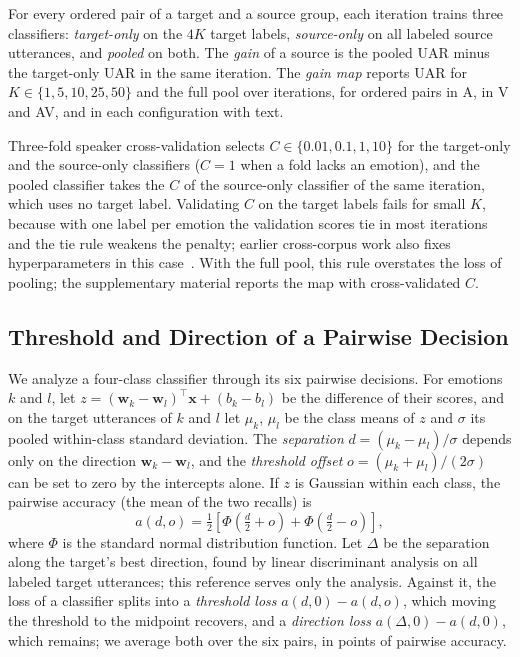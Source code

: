 For every ordered pair of a target and a source group, each iteration trains three classifiers: \emph{target-only} on the $4K$ target labels, \emph{source-only} on all labeled source utterances, and \emph{pooled} on both.
The \emph{gain} of a source is the pooled UAR minus the target-only UAR in the same iteration.
The \emph{gain map} reports UAR for $K \in \{1, 5, 10, 25, 50\}$ and the full pool over  iterations, for  ordered pairs in A,  in V and AV, and  in each configuration with text.

Three-fold speaker cross-validation selects $C \in \{0.01, 0.1, 1, 10\}$ for the target-only and the source-only classifiers ($C=1$ when a fold lacks an emotion), and the pooled classifier takes the $C$ of the source-only classifier of the same iteration, which uses no target label.
Validating $C$ on the target labels fails for small $K$, because with one label per emotion the validation scores tie in most iterations and the tie rule weakens the penalty; earlier cross-corpus work also fixes hyperparameters in this case~\cite{gideon2021addog}.
With the full pool, this rule overstates the loss of pooling; the supplementary material reports the map with cross-validated $C$.

\subsection{Threshold and Direction of a Pairwise Decision}
\label{sec:setting-model}

We analyze a four-class classifier through its six pairwise decisions.
For emotions $k$ and $l$, let $z = (\mathbf{w}_k - \mathbf{w}_l)^{\top}\mathbf{x} + (b_k - b_l)$ be the difference of their scores, and on the target utterances of $k$ and $l$ let $\mu_k$, $\mu_l$ be the class means of $z$ and $\sigma$ its pooled within-class standard deviation.
The \emph{separation} $d = (\mu_k - \mu_l)/\sigma$ depends only on the direction $\mathbf{w}_k - \mathbf{w}_l$, and the \emph{threshold offset} $o = (\mu_k + \mu_l)/(2\sigma)$ can be set to zero by the intercepts alone.
If $z$ is Gaussian within each class, the pairwise accuracy (the mean of the two recalls) is
\begin{equation}
\label{eq:twocloud}
a(d, o) = \tfrac{1}{2}\left[\Phi\!\left(\tfrac{d}{2} + o\right) + \Phi\!\left(\tfrac{d}{2} - o\right)\right],
\end{equation}
where $\Phi$ is the standard normal distribution function.
Let $\Delta$ be the separation along the target's best direction, found by linear discriminant analysis on all labeled target utterances; this reference serves only the analysis.
Against it, the loss of a classifier splits into a \emph{threshold loss} $a(d, 0) - a(d, o)$, which moving the threshold to the midpoint recovers, and a \emph{direction loss} $a(\Delta, 0) - a(d, 0)$, which remains; we average both over the six pairs, in points of pairwise accuracy.

